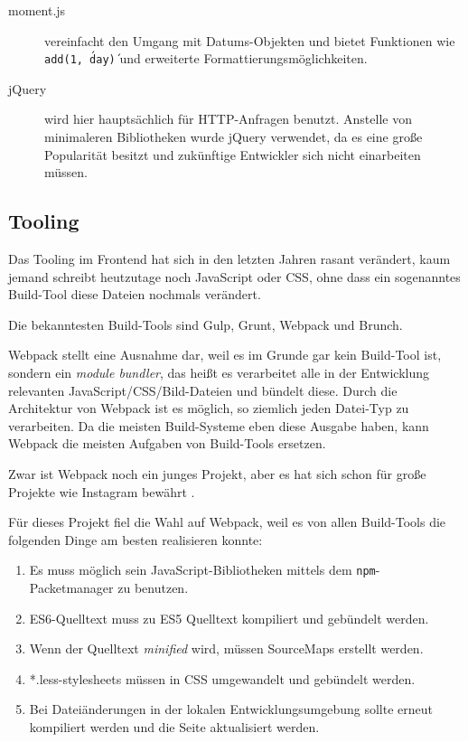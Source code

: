 \documentclass[12pt,twoside]{book}
\begin{document}
\begin{description}
	\item[moment.js \cite{momentjs}] vereinfacht den Umgang mit Datums-Objekten und bietet Funktionen wie \texttt{add(1, \'day\')} und erweiterte Formattierungsmöglichkeiten.
	\item[jQuery] wird hier hauptsächlich für HTTP-Anfragen benutzt. Anstelle von minimaleren Bibliotheken wurde jQuery verwendet, da es eine große Popularität besitzt und zukünftige Entwickler sich nicht einarbeiten müssen.
\end{description}

\subsection{Tooling}

Das Tooling im Frontend hat sich in den letzten Jahren rasant verändert, kaum jemand schreibt heutzutage noch JavaScript oder CSS, ohne dass ein sogenanntes Build-Tool diese Dateien nochmals verändert.

Die bekanntesten Build-Tools sind Gulp\cite{gulp}, Grunt\cite{grunt}, Webpack\cite{webpack} und Brunch\cite{brunch}.

Webpack stellt eine Ausnahme dar, weil es im Grunde gar kein Build-Tool ist, sondern ein \textit{module bundler}, das heißt es verarbeitet alle in der Entwicklung relevanten JavaScript/CSS/Bild-Dateien und bündelt diese. Durch die Architektur von Webpack ist es möglich, so ziemlich jeden Datei-Typ zu verarbeiten.
Da die meisten Build-Systeme eben diese Ausgabe haben, kann Webpack die meisten Aufgaben von Build-Tools ersetzen.

Zwar ist Webpack noch ein junges Projekt, aber es hat sich schon für große Projekte wie Instagram bewährt \cite{petehuntwebpack}.

Für dieses Projekt fiel die Wahl auf Webpack, weil es von allen Build-Tools die folgenden Dinge am besten realisieren konnte:

\begin{enumerate}
	\item Es muss möglich sein JavaScript-Bibliotheken mittels dem \texttt{npm}-Packetmanager zu benutzen.
	\item ES6-Quelltext muss zu ES5 Quelltext kompiliert und gebündelt werden.
	\item Wenn der Quelltext \textit{minified} wird, müssen SourceMaps erstellt werden.
	\item *.less-stylesheets müssen in CSS umgewandelt und gebündelt werden.
	\item Bei Dateiänderungen in der lokalen Entwicklungsumgebung sollte erneut kompiliert werden und die Seite aktualisiert werden.
\end{enumerate}
\end{document}
